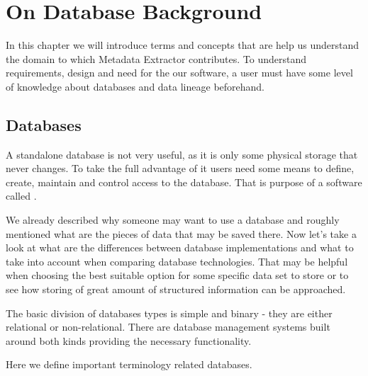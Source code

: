 \chapter{On Database Background}
\label{on_database_background}

In this chapter we will introduce terms and concepts that are help us understand the domain to which Metadata Extractor contributes. To understand requirements, design and need for the our software, a user must have some level of knowledge about databases and data lineage beforehand.

\section{Databases}

A standalone database is not very useful, as it is only some physical storage that never changes. To take the full advantage of it users need some means to define, create, maintain and control access to the database. That is purpose of a software called .

We already described why someone may want to use a database and roughly mentioned what are the pieces of data that may be saved there. 
Now let's take a look at what are the differences between database implementations and what to take into account when comparing database technologies.
That may be helpful when choosing the best suitable option for some specific data set to store or to see how storing of great amount of structured information can be approached.

The basic division of databases types is simple and binary - they are either relational or non-relational. There are database management systems built around both kinds providing the necessary functionality.

Here we define important terminology related databases.

